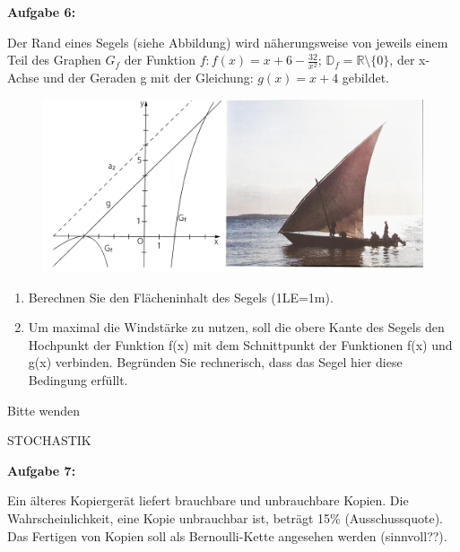 \documentclass[a4paper,12pt]{article}
\newcommand{\Aufgabe}[1]{
  {
  \vspace*{0.5cm}
  \textsf{\textbf{Aufgabe #1}}
  \vspace*{0.2cm}
  
  }
}
\begin{document}
\newpage





\Aufgabe {6:} 
Der Rand eines Segels (siehe Abbildung) wird näherungsweise von jeweils einem Teil des Graphen $G_f$ der Funktion $f: f(x)=x+6-\frac{32}{x^2}$;
$ \mathbb{D}_f= \mathbb{R}\setminus \{0\}$, der x-Achse und der Geraden g mit der Gleichung: $g(x)=x+4$ gebildet.

\begin{figure}[h!]
  \begin{center}
    \includegraphics[width=1 \linewidth]{bols201202.jpeg}
  \end{center}
\end{figure}

\begin{enumerate}[label={\alph*)}]
\item Berechnen Sie den Flächeninhalt des Segels (1LE=1m).
\item Um maximal die Windstärke zu nutzen, soll die obere Kante des Segels den Hochpunkt der Funktion f(x) mit dem Schnittpunkt der Funktionen f(x) und g(x) verbinden. Begründen Sie rechnerisch, dass das Segel hier diese Bedingung erfüllt. 
\end{enumerate}  
\begin{flushright}Bitte wenden \end{flushright}
\newpage
\addtolength{\voffset}{-2cm}

STOCHASTIK

\Aufgabe{7:} 

Ein älteres Kopiergerät liefert brauchbare und unbrauchbare Kopien. Die Wahrscheinlichkeit, eine Kopie unbrauchbar ist, beträgt 15\% (Ausschussquote). Das Fertigen von Kopien soll als Bernoulli-Kette angesehen werden (sinnvoll??).
\end{document}
